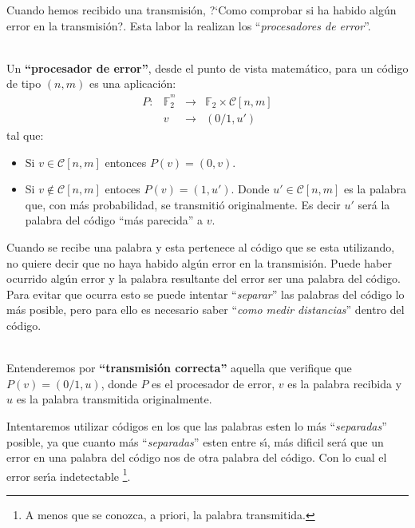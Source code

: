 Cuando hemos recibido una transmisi\'on, ?`Como comprobar si ha habido alg\'un
error en la transmisi\'on?. Esta labor la realizan los ``\emph{procesadores de
error}''.
\begin{definicion}
\ \\
Un \textbf{``procesador de error''}, desde el punto de vista matem\'atico, 
para un c\'odigo de tipo $(n,m)$ es una aplicaci\'on:
\begin{displaymath}
\begin{array}{cccc}
P:&\mathbb{F}^{^m}_2&\longrightarrow & \mathbb{F}_2\times \mathcal{C}[n,m] \\
 & v&\longrightarrow & (0/1,u')
\end{array}
\end{displaymath}
tal que:
\begin{itemize}
\item Si $v \in \mathcal{C}[n,m]$ entonces $P(v)=(0,v)$.
\item Si $v \notin \mathcal{C}[n,m]$ entoces $P(v)=(1,u')$. Donde $u'\in
\mathcal{C}[n,m]$ es la palabra que, con m\'as probabilidad, se transmiti\'o
originalmente. Es decir $u'$ ser\'a la palabra del c\'odigo ``m\'as parecida''
a $v$.
\end{itemize}
\end{definicion}
Cuando se recibe una palabra y esta pertenece al c\'odigo que se esta utilizando, no quiere decir que no haya habido alg\'un error en la transmisi\'on. Puede
haber ocurrido alg\'un error y la palabra resultante del error ser una palabra
del c\'odigo. Para evitar que ocurra esto se puede intentar ``\emph{separar}''
las palabras del c\'odigo lo m\'as posible, pero para ello es necesario saber
``\emph{como medir distancias}'' dentro del c\'odigo.
\begin{definicion}
\ \\
Entenderemos por \textbf{``transmisi\'on correcta''} aquella que verifique que
$P(v)=(0/1,u)$, donde $P$ es el procesador de error, $v$ es la palabra recibida
y $u$ es la palabra transmitida originalmente.
\end{definicion}
Intentaremos utilizar c\'odigos en los que las palabras esten lo m\'as
``\emph{separadas}'' posible, ya que cuanto m\'as ``\emph{separadas}'' esten
entre s\'{\i}, m\'as dificil ser\'a que un error en una palabra del c\'odigo nos
de otra palabra del c\'odigo. Con lo cual el error ser\'{\i}a indetectable%
\footnote{A menos que se conozca, a priori, la palabra transmitida.}.\\

